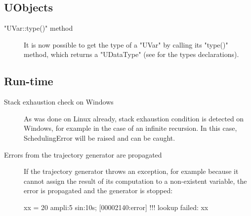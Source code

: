 \subsection{UObjects}
\begin{description}
\item["UVar::type()" method]

It is now possible to get the type of a "UVar" by calling its "type()"
method, which returns a "UDataType" (see  for the
types declarations).
\end{description}

\subsection{Run-time}
\begin{description}
\item[Stack exhaustion check on Windows]

As was done on Linux already, stack exhaustion condition is detected
on Windows, for example in the case of an infinite recursion. In this
case, SchedulingError will be raised and can be caught.

\item[Errors from the trajectory generator are propagated]

If the trajectory generator throws an exception, for example because it
cannot assign the result of its computation to a non-existent variable,
the error is propagated and the generator is stopped:

\begin{urbiscript}
xx = 20 ampli:5 sin:10s;
[00002140:error] !!! lookup failed: xx
\end{urbiscript}
\end{description}

